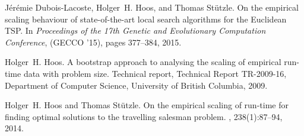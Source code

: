 
\begin{thebibliography}{1}

J{\'e}r{\'e}mie Dubois-Lacoste, Holger~H. Hoos, and Thomas St{\"u}tzle.
\newblock On the empirical scaling behaviour of state-of-the-art local search
  algorithms for the {E}uclidean {TSP}.
\newblock In {\em Proceedings of the 17th Genetic and Evolutionary Computation Conference}, (GECCO '15), pages 377--384, 2015.

Holger~H. Hoos.
\newblock A bootstrap approach to analysing the scaling of empirical run-time
  data with problem size.
\newblock Technical report, Technical Report TR-2009-16, Department of Computer Science, University of British
  Columbia, 2009.

Holger~H. Hoos and Thomas St{\"u}tzle.
\newblock On the empirical scaling of run-time for finding optimal solutions to
  the travelling salesman problem.
, 238(1):87--94, 2014.

\end{thebibliography}


